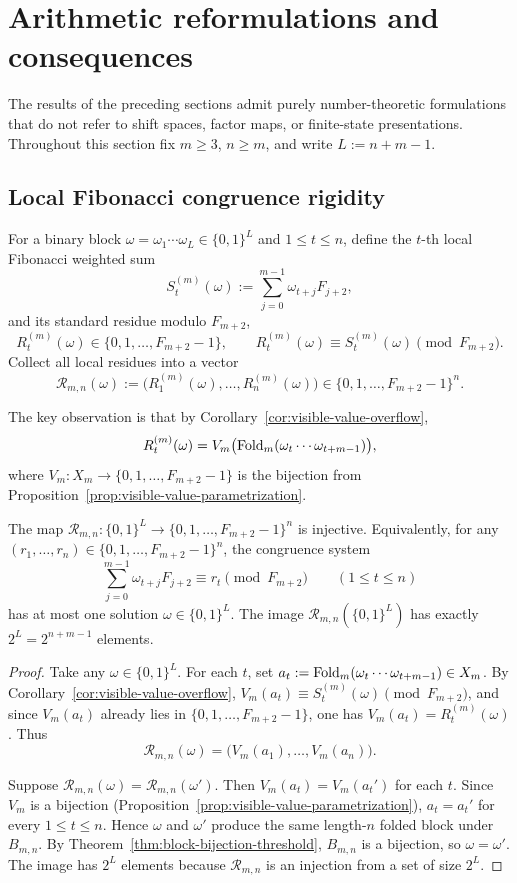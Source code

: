 \section{Arithmetic reformulations and consequences}

The results of the preceding sections admit purely number-theoretic
formulations that do not refer to shift spaces, factor maps, or finite-state
presentations.  Throughout this section fix $m\ge 3$, $n\ge m$, and write
$L:=n+m-1$.

\subsection{Local Fibonacci congruence rigidity}

For a binary block $\omega=\omega_1\cdots\omega_L\in\{0,1\}^L$ and
$1\le t\le n$, define the $t$-th local Fibonacci weighted sum
\[
S_t^{(m)}(\omega):=\sum_{j=0}^{m-1}\omega_{t+j}F_{j+2},
\]
and its standard residue modulo $F_{m+2}$,
\[
R_t^{(m)}(\omega)\in\{0,1,\ldots,F_{m+2}-1\},
\qquad
R_t^{(m)}(\omega)\equiv S_t^{(m)}(\omega)\pmod{F_{m+2}}.
\]
Collect all local residues into a vector
\[
\mathcal R_{m,n}(\omega):=
\bigl(R_1^{(m)}(\omega),\ldots,R_n^{(m)}(\omega)\bigr)
\in\{0,1,\ldots,F_{m+2}-1\}^n.
\]

The key observation is that by Corollary~\ref{cor:visible-value-overflow},
\[
R_t^{(m)}(\omega)=V_m\bigl(\operatorname{Fold}_m(\omega_t\cdots\omega_{t+m-1})\bigr),
\]
where $V_m:X_m\to\{0,1,\ldots,F_{m+2}-1\}$ is the bijection from
Proposition~\ref{prop:visible-value-parametrization}.

\begin{theorem}
\label{thm:congruence-rigidity}
The map
$\mathcal R_{m,n}:\{0,1\}^L\to\{0,1,\ldots,F_{m+2}-1\}^n$
is injective.  Equivalently, for any
$(r_1,\ldots,r_n)\in\{0,1,\ldots,F_{m+2}-1\}^n$,
the congruence system
\[
\sum_{j=0}^{m-1}\omega_{t+j}F_{j+2}\equiv r_t\pmod{F_{m+2}}
\qquad (1\le t\le n)
\]
has at most one solution $\omega\in\{0,1\}^L$.
The image $\mathcal R_{m,n}(\{0,1\}^L)$ has exactly $2^L=2^{n+m-1}$ elements.
\end{theorem}

\begin{proof}
Take any $\omega\in\{0,1\}^L$.  For each $t$, set
$a_t:=\operatorname{Fold}_m(\omega_t\cdots\omega_{t+m-1})\in X_m$.  By
Corollary~\ref{cor:visible-value-overflow},
$V_m(a_t)\equiv S_t^{(m)}(\omega)\pmod{F_{m+2}}$, and since $V_m(a_t)$
already lies in $\{0,1,\ldots,F_{m+2}-1\}$, one has
$V_m(a_t)=R_t^{(m)}(\omega)$.  Thus
\[
\mathcal R_{m,n}(\omega)=\bigl(V_m(a_1),\ldots,V_m(a_n)\bigr).
\]

Suppose $\mathcal R_{m,n}(\omega)=\mathcal R_{m,n}(\omega')$.  Then
$V_m(a_t)=V_m(a_t')$ for each $t$.  Since $V_m$ is a bijection
(Proposition~\ref{prop:visible-value-parametrization}), $a_t=a_t'$ for every
$1\le t\le n$.  Hence $\omega$ and $\omega'$ produce the same length-$n$
folded block under $B_{m,n}$.  By
Theorem~\ref{thm:block-bijection-threshold}, $B_{m,n}$ is a bijection, so
$\omega=\omega'$.  The image has $2^L$ elements because $\mathcal R_{m,n}$ is
an injection from a set of size $2^L$.
\end{proof}

